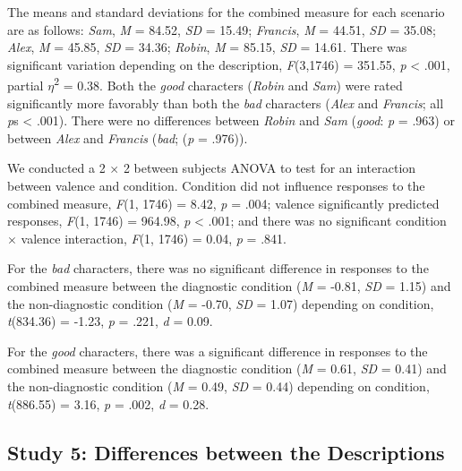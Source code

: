 \documentclass[
  american,
  man,mask,floatsintext]{apa6}
\begin{document}
The means and standard deviations for the combined measure for each scenario are as follows:
\emph{Sam},
\emph{M} = 84.52, \emph{SD} = 15.49;
\emph{Francis},
\emph{M} = 44.51, \emph{SD} = 35.08;
\emph{Alex},
\emph{M} = 45.85, \emph{SD} = 34.36;
\emph{Robin},
\emph{M} = 85.15, \emph{SD} = 14.61. There was significant variation depending on the description, \emph{F}(3,1746) = 351.55, \emph{p} \textless{} .001, partial \(\eta\)\textsuperscript{2} = 0.38. Both the \emph{good} characters (\emph{Robin} and \emph{Sam}) were rated significantly more favorably than both the \emph{bad} characters (\emph{Alex} and \emph{Francis}; all \emph{p}s \textless{} .001). There were no differences between \emph{Robin} and \emph{Sam} (\emph{good}: \emph{p} = .963) or between \emph{Alex} and \emph{Francis} (\emph{bad}; (\emph{p} = .976)).

We conducted a 2 \(\times\) 2 between subjects ANOVA to test for an interaction between valence and condition.
Condition did not influence responses to the combined measure,
\emph{F}(1, 1746) = 8.42, \emph{p} = .004;
valence significantly predicted responses,
\emph{F}(1, 1746) = 964.98, \emph{p} \textless{} .001;
and there was no significant condition \(\times\) valence interaction,
\emph{F}(1, 1746) = 0.04, \emph{p} = .841.

For the \emph{bad} characters, there was no significant difference in responses to the combined measure between the diagnostic condition (\emph{M} = -0.81, \emph{SD} = 1.15) and the non-diagnostic condition (\emph{M} = -0.70, \emph{SD} = 1.07) depending on condition, \emph{t}(834.36) = -1.23, \emph{p} = .221, \emph{d} = 0.09.

For the \emph{good} characters, there was a significant difference in responses to the combined measure between the diagnostic condition (\emph{M} = 0.61, \emph{SD} = 0.41) and the non-diagnostic condition (\emph{M} = 0.49, \emph{SD} = 0.44) depending on condition, \emph{t}(886.55) = 3.16, \emph{p} = .002, \emph{d} = 0.28.

\hypertarget{study-5-differences-between-the-descriptions}{%
\subsection{Study 5: Differences between the Descriptions}\label{study-5-differences-between-the-descriptions}}
\end{document}
